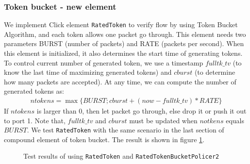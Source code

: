 \documentclass[a4paper]{article}
\begin{document}
  \subsubsection{Token bucket - new element}
  We implement Click element \texttt{RatedToken} to verify flow by using Token Bucket Algorithm, and each token allows one packet go through. This element needs two parameters BURST (number of packets) and RATE (packets per second). When this element is initialized, it also determines the start time of generating tokens. To control current number of generated token, we use a timestamp $fulltk\_tv$ (to know the last time of maximizing generated tokens) and $cburst$ (to determine how many packets are accepted). At any time, we can compute the number of generated tokens as:
  \begin{align*}ntokens = \max\{BURST; cburst + (now - fulltk\_tv)*RATE\}\end{align*}
  If $ntokens$ is larger than 0, then let packet go through, else drop it or push it out to port 1. Note that, $fulltk\_tv$ and $cburst$ must be updated when $notkens$ equals $BURST$. We test \texttt{RatedToken} with the same scenario in the last section of compound element of token bucket. The result is shown in figure \ref{fig:test-tk-element}.
  \begin{figure}
      \centering
      \caption{Test results of using \texttt{RatedToken} and \texttt{RatedTokenBucketPolicer2}}
      \label{fig:test-tk-element}
  \end{figure}
\end{document}
